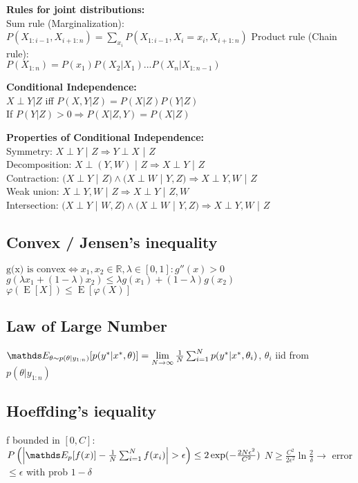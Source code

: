 
\textbf{Rules for joint distributions:}\\
Sum rule (Marginalization):\\
    $P(X_{1:i-1}, X_{i+1:n})=\sum_{x_i}P(X_{1:i-1}, X_i=x_i, X_{i+1:n})$
Product rule (Chain rule):\\
    $P(X_{1:n})=P(x_1)P(X_2|X_1)...P(X_n|X_{1:n-1})$

\textbf{Conditional Independence:}\\
$X\perp Y | Z $ iff $P(X,Y|Z)=P(X|Z)P(Y|Z)$\\
If $P(Y|Z)>0 \Rightarrow P(X|Z,Y)=P(X|Z)$

\textbf{Properties of Conditional Independence:}\\
Symmetry: $X \perp Y$ | $Z \Rightarrow Y \perp X$ | $Z$\\
Decomposition: $X \perp (Y,W)$ | $Z \Rightarrow X \perp Y$ | $Z$\\
Contraction: $(X \perp Y$ | $Z) \wedge (X \perp W$ | $Y, Z) \Rightarrow X \perp Y, W$ | $Z$\\
Weak union: $X \perp Y,W$ | $Z \Rightarrow X \perp Y$ | $Z, W$\\
Intersection: $(X \perp Y$ | $W, Z) \wedge (X \perp W$ | $Y, Z) \Rightarrow X \perp Y, W$ | $Z$


\subsection{Convex / Jensen's inequality}
$\text{g(x) is convex} \Leftrightarrow x_1,x_2 \in \mathbb{R}, \lambda \in [0,1]: g''(x) > 0$\\
$g(\lambda x_1 + (1-\lambda) x_2) \leq \lambda g(x_1) + (1-\lambda) g(x_2)$
$\varphi(\operatorname{E}[X]) \leq  \operatorname{E}[\varphi(X)]$


\subsection{Law of Large Number}
$\E[\theta \sim p(\theta|y_{1:n})]{p(y^{*}|x^{*}, \theta)} =
\lim\limits_{N \to \infty} \frac{1}{N} \sum_{i=1}^{N}p(y^{*}|x^{*}, \theta_{i})$, $\theta_{i}$ iid from $p(\theta|y_{1:n})$\\

\subsection{Hoeffding's iequality}
f bounded in $\left[0,C\right]$:\\
$P\bb{\abs{\E[p]{f(x)}-\frac{1}{N}\sum_{i=1}^{N}f(x_{i})} > \epsilon} \leq 2\exp(-\frac{2N\epsilon^{2}}{C^2})$
$N \geq \frac{C^2}{2\epsilon^2}\ln{\frac{2}{\delta}} \rightarrow$ error $\leq \epsilon$ with prob $1 - \delta$



